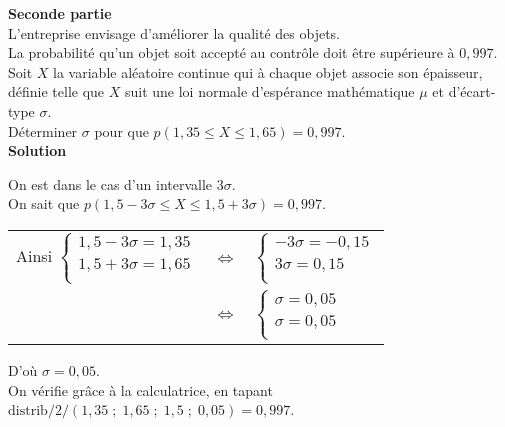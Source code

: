 \textbf{Seconde partie} \\

L'entreprise envisage d'améliorer la qualité des objets. \\
La probabilité qu'un objet soit accepté au contrôle doit être supérieure à $0,997$. \\

Soit $X$ la variable aléatoire continue qui à chaque objet associe son épaisseur, définie telle que $X$ suit une loi normale d'espérance mathématique $\mu$ et d'écart-type $\sigma$. \\

Déterminer $\sigma$ pour que $p\left(1,35 \leqslant X \leqslant 1,65\right) = 0,997$. \\

\textbf{Solution} 

On est dans le cas d'un intervalle $3 \sigma$. \\

On sait que $p\left(1,5 - 3\sigma \leqslant X \leqslant 1,5 + 3\sigma\right) = 0,997$. \\

\begin{tabular}{lll}
\hspace*{-.3cm} Ainsi $\left\{
  \begin{array}{l}
    1,5 - 3\sigma = 1,35 \\
    1,5 + 3\sigma = 1,65 \\
  \end{array}
\right.$ & $\Longleftrightarrow$ & $\left\{
  \begin{array}{l}
    -3\sigma = -0,15 \\
     3\sigma = 0,15 \\ 
  \end{array}
\right.$ \vspace*{.3cm} \\
& $\Longleftrightarrow$ & $\left\{
  \begin{array}{l}
    \sigma = 0,05 \\
    \sigma = 0,05 \\
  \end{array}
\right.$ \\
\end{tabular}

D'où $\sigma = 0,05$. \\

On vérifie grâce à la calculatrice, en tapant $\mathrm{distrib}/2/\left(1,35 \; ; \; 1,65 \; ; \; 1,5 \; ; \; 0,05\right) = 0,997$. \\

